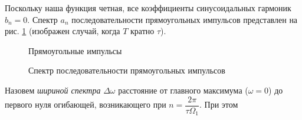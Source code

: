 \documentclass[a4paper,12pt]{article}
\begin{document}
Поскольку наша функция четная, все коэффициенты синусоидальных гармоник $b_{n}=0$. Спектр $a_{n}$ последовательности прямоугольных импульсов представлен на рис. \ref{pic:2} (изображен случай, когда $T$ кратно $\tau$).
	

\begin{figure}[h]
    \begin{minipage}[h]{0.5\linewidth}
        \caption{Прямоугольные импульсы}
        \label{pic:1}
    \end{minipage}
    \begin{minipage}[h]{0.5\linewidth}
        \caption{Спектр последовательности прямоугольных импульсов}
        \label{pic:2}
    \end{minipage}
\end{figure}

Назовем \textit{шириной спектра} $\Delta \omega$ расстояние от главного максимума ($\omega =0$) до первого нуля огибающей, возникающего при $n=\dfrac{2\pi}{\tau \Omega_{1}}$. При этом 
\end{document}
